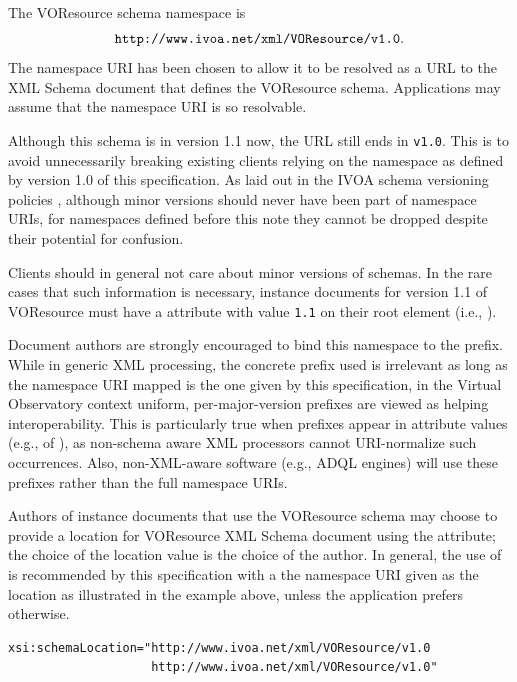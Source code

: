 \documentclass[11pt,a4paper]{ivoa}
\begin{document}
\label{sect:namespace}


The VOResource schema namespace is 
$$\hbox{\texttt{http://www.ivoa.net/xml/VOResource/v1.0}}.$$
The namespace URI has been chosen to allow it to be resolved as a URL
to the XML Schema document that defines the VOResource schema.
Applications may assume that the namespace URI is so resolvable.

Although this schema is in version 1.1 now, the URL still ends in
\texttt{v1.0}.  This is to avoid unnecessarily breaking existing clients
relying on the namespace as defined by version 1.0 of this
specification.  As laid out in the IVOA schema versioning policies
\citep{note:schemaevolution}, although minor versions should never have
been part of namespace URIs, for namespaces defined before this note
they cannot be dropped despite their potential for confusion.

Clients should in general not care about minor versions of schemas.  In
the rare cases that such information is necessary, instance documents
for version 1.1 of VOResource must have a  attribute
with value \texttt{1.1} on their root element (i.e., ).

Document authors are strongly encouraged to bind this namespace to the
 prefix.  While in generic XML processing, the concrete
prefix used is irrelevant as long as the namespace URI mapped is the one
given by this specification, in the Virtual Observatory context uniform,
per-major-version prefixes are viewed as helping interoperability.  This
is particularly true when prefixes appear in attribute values (e.g.,
of ), as non-schema aware XML processors cannot
URI-normalize such occurrences.  Also, non-XML-aware software (e.g., ADQL
engines) will use these prefixes rather than the full namespace URIs.

Authors of instance documents that use the VOResource schema may choose
to provide a location for VOResource XML Schema document using the
 attribute; the choice of the location value
is the choice of the author.  In general, the use of
 is recommended by this specification with
a the namespace URI given as the location as illustrated in the example
above, unless the application prefers otherwise.


\begin{verbatim}
xsi:schemaLocation="http://www.ivoa.net/xml/VOResource/v1.0
                    http://www.ivoa.net/xml/VOResource/v1.0"
\end{verbatim}
\end{document}
